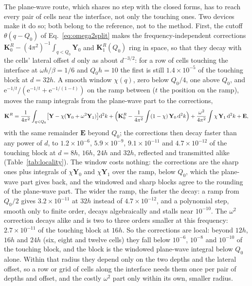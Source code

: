 \documentclass[11pt,a4paper]{article}
\newcommand{\bK}{\mathbf{K}}
\newcommand{\dd}{\mathrm{d}}
\newcommand{\ee}{\mathrm{e}}
\begin{document}
The plane-wave route, which shares no step with the closed forms, has to reach every pair of cells near the
interface, not only the touching ones. Two devices make it do so; both belong to the reference, not to the
method. First, the cutoff $\theta(q-Q_0)$ of Eq.~\eqref{eq:omega2split} makes the frequency-independent
corrections $\bK^{R}_0-(4\pi^2)^{-1}\int_{q<Q_0}\mathbf Y_0$ and $\bK^{R}_1(Q_0)$ ring in space, so that they
decay with the cells' lateral offset $d$ only as about $d^{-3/2}$: for a row of cells touching the interface at
$\omega h/\beta=1/6$ and $Q_0h=10$ the first is still $1.4\times10^{-5}$ of the touching block at $d=32h$. A
smooth window $\chi(q)$, zero below $Q_0/4$, one above $Q_0$, and $\ee^{-1/t}/(\ee^{-1/t}+\ee^{-1/(1-t)})$ on the
ramp between ($t$ the position on the ramp), moves the ramp integrals from the plane-wave part to the
corrections,
\begin{equation}\label{eq:windowsplit}
  \bK^{R}=\frac{1}{4\pi^2}\int_{q<Q_0}\bigl[\mathbf Y-\chi(\mathbf Y_0+\omega^2\mathbf Y_1)\bigr]\dd^2k
  +\Bigl(\bK^{R}_0-\frac{1}{4\pi^2}\int(1-\chi)\,\mathbf Y_0\,\dd^2k\Bigr)
  +\frac{\omega^2}{4\pi^2}\int\chi\,\mathbf Y_1\,\dd^2k+\mathbf E,
\end{equation}
with the same remainder $\mathbf E$ beyond $Q_0$; the corrections then decay faster than any power of $d$,
to $1.2\times10^{-6}$, $5.9\times10^{-9}$, $9.1\times10^{-11}$ and $4.7\times10^{-12}$ of the touching block at
$d=8h$, $16h$, $24h$ and $32h$, reflected and transmitted alike (Table~\ref{tab:locality}). The window costs
nothing: the corrections are the sharp ones plus integrals of $\chi\mathbf Y_0$ and $\chi\mathbf Y_1$ over the
ramp, below $Q_0$, which the plane-wave part gives back, and the windowed and sharp blocks agree to the
rounding of the plane-wave part. The wider the ramp, the faster the decay: a ramp from $Q_0/2$ gives $3.2\times10^{-11}$ at $32h$
instead of $4.7\times10^{-12}$, and a polynomial step, smooth only to finite order, decays algebraically and
stalls near $10^{-10}$. The $\omega^2$ correction decays alike and is two to three orders smaller at this
frequency: $2.7\times10^{-11}$ of the touching block at $16h$. So the corrections are local: beyond $12h$,
$16h$ and $24h$ (six, eight and twelve cells) they fall below $10^{-6}$, $10^{-8}$ and $10^{-10}$ of the
touching block, and the block is the windowed plane-wave integral below $Q_0$ alone. Within that radius they depend
only on the two depths and the lateral offset, so a row or grid of cells along the interface needs them once
per pair of depths and offset, and the costly $\omega^2$ part only within its own, smaller radius.
\end{document}
